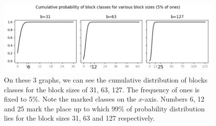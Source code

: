 \begin{figure}
	\centerline{
		\includegraphics[width=\textwidth]{images/hybrid_encoding_motivation}
	}
	\caption[TODO]{On these 3 graphs, we can see the cumulative distribution
    of blocks classes for the block sizes of 31, 63, 127. The frequency of ones is
    fixed to 5\%. Note the marked classes on the $x$-axis. Numbers 6, 12 and
    25 mark the place up to which 99\% of probability distribution lies for
    the block sizes 31, 63 and 127 respectively.
	}
	\label{obr:hybridEncodingDistribution}
\end{figure}

